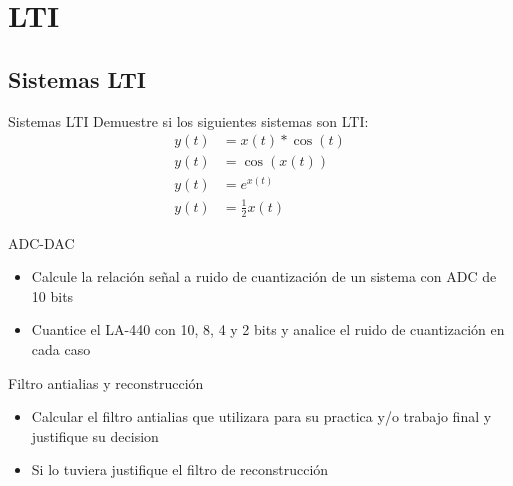 \subtitle{Trabajo Practico}
\begin{frame}[c]
\maketitle
{}
\end{frame}
 \section{LTI}
 \subsection{Sistemas LTI}
 \begin{frame}{Sistemas LTI}
 Demuestre si los siguientes sistemas son LTI:\\
 \begin{align*}
    y(t) &= x(t)*\cos{(t)} \\
    y(t) &= \cos(x(t)) \\
    y(t) &= e^{x(t)} \\
    y(t) &= \frac{1}{2}x(t)
 \end{align*}
    \vfill
 \end{frame}
 \begin{frame}{ADC-DAC}
    \begin{itemize}
       \item{Calcule la relación señal a ruido de cuantización de un sistema con ADC de 10 bits}
       \item{Cuantice el LA-440 con 10, 8, 4 y 2 bits y analice el ruido de cuantización en cada caso}
    \end{itemize}
 \end{frame}
 \begin{frame}{Filtro antialias y reconstrucción}
    \begin{itemize}
       \item{Calcular el filtro antialias que utilizara para su practica y/o trabajo final y justifique su decision}
       \item{Si lo tuviera justifique el filtro de reconstrucción}
    \end{itemize}
 \end{frame}
